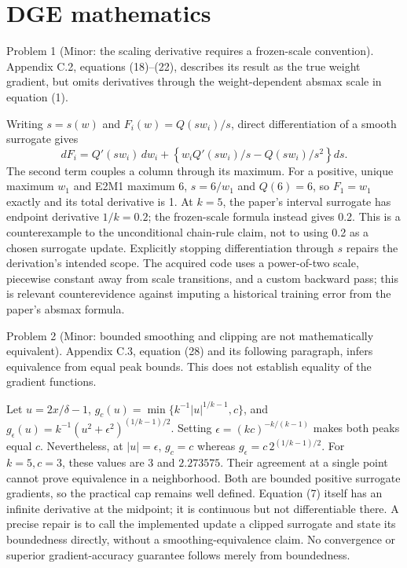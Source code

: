 \documentclass[10pt]{article}
\begin{document}
\section*{DGE mathematics}
Problem 1 (Minor: the scaling derivative requires a frozen-scale convention).  Appendix C.2, equations (18)–(22), describes its result as the true weight gradient, but omits derivatives through the weight-dependent absmax scale in equation (1).\par
Writing \(s=s(w)\) and \(F_i(w)=Q(sw_i)/s\), direct differentiation of a smooth surrogate gives \[dF_i=Q'(sw_i)\,dw_i+
 \left\{w_iQ'(sw_i)/s-Q(sw_i)/s^2\right\}ds.\] The second term couples a column through its maximum. For a positive, unique maximum \(w_1\) and E2M1 maximum 6, \(s=6/w_1\) and \(Q(6)=6\), so \(F_1=w_1\) exactly and its total derivative is 1. At \(k=5\), the paper’s interval surrogate has endpoint derivative \(1/k=0.2\); the frozen-scale formula instead gives 0.2. This is a counterexample to the unconditional chain-rule claim, not to using 0.2 as a chosen surrogate update. Explicitly stopping differentiation through \(s\) repairs the derivation’s intended scope. The acquired code uses a power-of-two scale, piecewise constant away from scale transitions, and a custom backward pass; this is relevant counterevidence against imputing a historical training error from the paper’s absmax formula.\par
Problem 2 (Minor: bounded smoothing and clipping are not mathematically equivalent).  Appendix C.3, equation (28) and its following paragraph, infers equivalence from equal peak bounds. This does not establish equality of the gradient functions.\par
Let \(u=2x/\delta-1\), \(g_c(u)=\min\{k^{-1}|u|^{1/k-1},c\}\), and \(g_\epsilon(u)=k^{-1}(u^2+\epsilon^2)^{(1/k-1)/2}\). Setting \(\epsilon=(kc)^{-k/(k-1)}\) makes both peaks equal \(c\). Nevertheless, at \(|u|=\epsilon\), \(g_c=c\) whereas \(g_\epsilon=c\,2^{(1/k-1)/2}\). For \(k=5,c=3\), these values are \(3\) and \(2.273575\). Their agreement at a single point cannot prove equivalence in a neighborhood. Both are bounded positive surrogate gradients, so the practical cap remains well defined. Equation (7) itself has an infinite derivative at the midpoint; it is continuous but not differentiable there. A precise repair is to call the implemented update a clipped surrogate and state its boundedness directly, without a smoothing-equivalence claim. No convergence or superior gradient-accuracy guarantee follows merely from boundedness.\par
\end{document}
